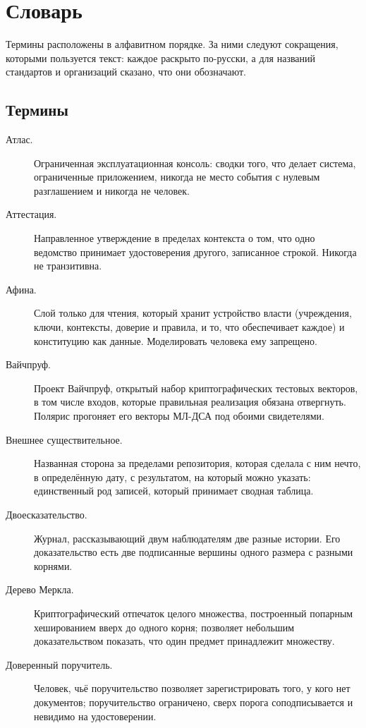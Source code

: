\section{Словарь}
\label{app:glossary}

Термины расположены в алфавитном порядке. За ними следуют сокращения, которыми пользуется
текст: каждое раскрыто по-русски, а для названий стандартов и организаций сказано, что они
обозначают.

\subsection*{Термины}

\begin{description}
  \item[Атлас.] Ограниченная эксплуатационная консоль: сводки того, что делает система, ограниченные
    приложением, никогда не место события с нулевым разглашением и никогда не человек.
  \item[Аттестация.] Направленное утверждение в пределах контекста о том, что одно ведомство принимает удостоверения другого, записанное строкой. Никогда не транзитивна.
  \item[Афина.] Слой только для чтения, который хранит устройство власти (учреждения, ключи, контексты,
    доверие и правила, и то, что обеспечивает каждое) и конституцию как данные. Моделировать
    человека ему запрещено.
  \item[Вайчпруф.] Проект Вайчпруф, открытый набор криптографических тестовых векторов, в том числе
    входов, которые правильная реализация обязана отвергнуть. Полярис прогоняет его векторы МЛ-ДСА под
    обоими свидетелями.
  \item[Внешнее существительное.] Названная сторона за пределами репозитория, которая сделала с ним нечто, в определённую дату, с результатом, на который можно указать: единственный род записей, который принимает сводная таблица.
  \item[Двоесказательство.] Журнал, рассказывающий двум наблюдателям две разные истории. Его доказательство есть две подписанные вершины одного размера с разными корнями.
  \item[Дерево Меркла.] Криптографический отпечаток целого множества, построенный попарным хешированием вверх до одного корня; позволяет небольшим доказательством показать, что один предмет принадлежит множеству.
  \item[Доверенный поручитель.] Человек, чьё поручительство позволяет зарегистрировать того, у кого нет документов; поручительство ограничено, сверх порога соподписывается и невидимо на удостоверении.

\end{description}
